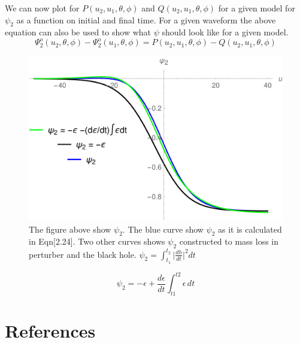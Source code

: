 \documentclass[prd,preprintnumbers,onecolumn,eqsecnum,floatfix,letter]{revtex4}
\begin{document}
 We can now plot for $P(u_2, u_1, \theta, \phi)$ and $Q(u_2, u_1, \theta, \phi)$ for a given model for $\psi_2$ as a function on initial and final time. For a given waveform the above equation can also be used to show what $\psi$ should look like for a given model. 	
 \begin{equation}
 	\Psi^{o}_{2}\left(u_2, \theta, \phi\right) - \Psi^{o}_{2}\left(u_1, \theta, \phi\right) = P(u_2, u_1, \theta, \phi) - Q(u_2, u_1, \theta, \phi)
 \end{equation}
\begin{figure}
	\includegraphics[width=5.5in]{../plots/BalanceLawTwosides.pdf}
	\caption{The figure above show $\psi_2$. The blue curve show $\psi_2$ as it is calculated in Eqn[2.24]. Two other curves shows $\psi_2$ constructed to mass loss in perturber and the black hole.
	$\psi_2 = \int_{t_1}^{t_2}\big|\frac{dh}{dt}\big|^{2}dt$ }
	\label{fig:RHSvsLHS}
\end{figure}
\begin{equation}
	\psi_{2} = -\epsilon + \frac{d\epsilon}{dt}\int_{t1}^{t2}\epsilon \,dt
\end{equation}
\section*{References}



\end{document}
